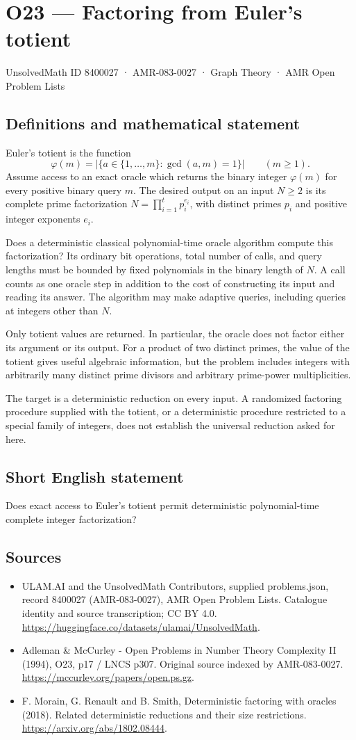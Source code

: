 \documentclass[11pt,a4paper]{article}
\begin{document}
\section*{O23 — Factoring from Euler's totient}\label{8400027}
{\small UnsolvedMath ID 8400027 · AMR-083-0027 · Graph Theory · AMR Open Problem Lists}
\subsection{Definitions and mathematical statement}
Euler's totient is the function
\[
\varphi(m)=|\{a\in\{1,\ldots,m\}:\gcd(a,m)=1\}|\qquad(m\ge1).
\]
Assume access to an exact oracle which returns the binary integer $\varphi(m)$ for every positive binary query $m$. The desired output on an input $N\ge2$ is its complete prime factorization $N=\prod_{i=1}^t p_i^{e_i}$, with distinct primes $p_i$ and positive integer exponents $e_i$.

Does a deterministic classical polynomial-time oracle algorithm compute this factorization? Its ordinary bit operations, total number of calls, and query lengths must be bounded by fixed polynomials in the binary length of $N$. A call counts as one oracle step in addition to the cost of constructing its input and reading its answer. The algorithm may make adaptive queries, including queries at integers other than $N$.

Only totient values are returned. In particular, the oracle does not factor either its argument or its output. For a product of two distinct primes, the value of the totient gives useful algebraic information, but the problem includes integers with arbitrarily many distinct prime divisors and arbitrary prime-power multiplicities.

The target is a deterministic reduction on every input. A randomized factoring procedure supplied with the totient, or a deterministic procedure restricted to a special family of integers, does not establish the universal reduction asked for here.
\subsection{Short English statement}
Does exact access to Euler’s totient permit deterministic polynomial-time complete integer factorization?
\subsection{Sources}
\begin{itemize}
\item[S1] ULAM.AI and the UnsolvedMath Contributors, supplied problems.json, record 8400027 (AMR-083-0027), AMR Open Problem Lists. Catalogue identity and source transcription; CC BY 4.0.
\url{https://huggingface.co/datasets/ulamai/UnsolvedMath}.
\item[S2] Adleman \& McCurley - Open Problems in Number Theory Complexity II (1994), O23, p17 / LNCS p307. Original source indexed by AMR-083-0027.
\url{https://mccurley.org/papers/open.ps.gz}.
\item[S3] F. Morain, G. Renault and B. Smith, Deterministic factoring with oracles (2018). Related deterministic reductions and their size restrictions.
\url{https://arxiv.org/abs/1802.08444}.
\end{itemize}
\end{document}

